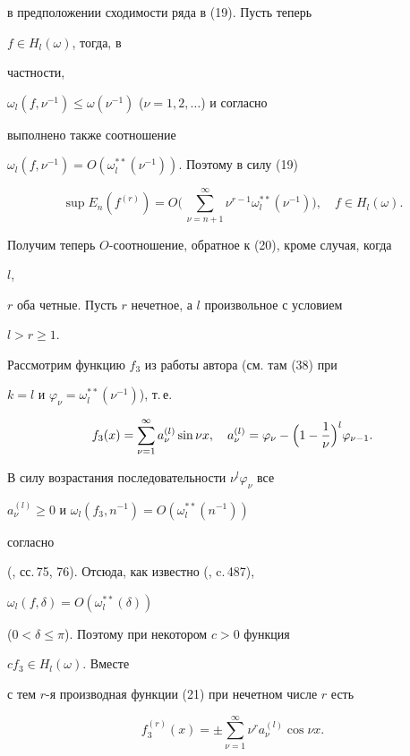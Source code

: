 в предположении сходимости ряда в (19). Пусть теперь


$f\in H_l(\omega)$, тогда, в


частности,


$\omega_l(f,\nu^{-1})\le\omega(\nu^{-1})$ ($\nu=1,2,\dotsc$) и согласно


\cite{St} выполнено также соотношение


$\omega_l(f,\nu^{-1})=O(\omega^{**}_l(\nu^{-1}))$. Поэтому в силу (19)


\begin{equation}


\sup E_n(f^{(r)})=O\biggl(\,\sum^\infty_{\nu=n+1}\nu^{r-1}


\omega^{**}_l(\nu^{-1})\biggr),\quad f\in H_l(\omega).


\end{equation}


Получим теперь $O$-соотношение, обратное к (20), кроме случая, когда


$l$,


$r$ оба четные. Пусть $r$ нечетное, а $l$ произвольное с условием


$l>r \ge 1$.


Рассмотрим функцию $f_3$ из работы автора \cite{Ge1} (см. там (38) при


$k=l$ и $\varphi_\nu=\omega^{**}_l(\nu^{-1})$), т.\,е.


\begin{equation}


f_3(x)=\sum^\infty_{\nu=1}a^{(l)}_\nu\sin\nu x,\quad


a^{(l)}_\nu=\varphi_\nu-\Bigl(1-\frac{1}{\nu}\Bigr)^l\varphi_{\nu-1}.


\end{equation}


В силу возрастания последовательности $\nu^l\varphi_\nu$ все


$a^{(l)}_\nu\ge 0$ и $\omega_l(f_3,n^{-1})=O(\omega^{**}_l(n^{-1}))$


согласно


(\cite{Ge1}, сс.\,75, 76). Отсюда, как известно (\cite{Bar}, c.\,487),


$\omega_l(f,\delta)=O(\omega^{**}_l(\delta))$


($0<\delta\le\pi$). Поэтому при некотором $c>0$ функция


$cf_3\in H_l(\omega)$. Вместе


с тем $r$-я производная функции (21) при нечетном числе $r$ есть


\begin{equation}


f^{(r)}_3(x)=\pm\sum^\infty_{\nu=1}\nu^ra^{(l)}_\nu\cos\nu x.


\end{equation}


